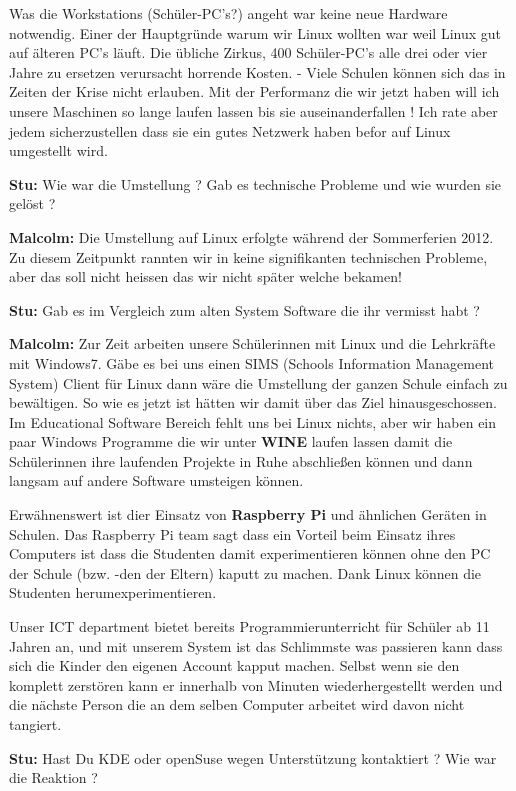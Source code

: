 \documentclass[10pt,a4paper,ngerman,twoside]{article} %
\begin{document}
Was die Workstations (Schüler-PC's?) angeht war keine neue Hardware notwendig. Einer der Hauptgründe warum wir Linux wollten war weil Linux gut auf älteren PC's läuft. Die übliche Zirkus, 400 Schüler-PC's alle drei oder vier Jahre zu ersetzen verursacht horrende Kosten.
-
Viele Schulen können sich das in Zeiten der Krise nicht erlauben. Mit der Performanz die wir jetzt haben will ich unsere Maschinen so lange laufen lassen bis sie auseinanderfallen ! Ich rate aber jedem sicherzustellen dass sie ein gutes Netzwerk haben befor auf Linux umgestellt wird.

\textbf{Stu:} Wie war die Umstellung ? Gab es technische Probleme und wie wurden sie gelöst ?

\textbf{Malcolm:} Die Umstellung auf Linux erfolgte während der Sommerferien 2012. Zu diesem Zeitpunkt rannten wir in keine signifikanten technischen Probleme, aber das soll nicht heissen das wir nicht später welche bekamen!

\textbf{Stu:} Gab es im Vergleich zum alten System Software die ihr vermisst habt ?

\textbf{Malcolm:} Zur Zeit arbeiten unsere Schülerinnen mit Linux und die Lehrkräfte mit Windows7. Gäbe es bei uns einen SIMS (Schools Information Management System) Client für Linux dann wäre die Umstellung der ganzen Schule einfach zu bewältigen. So wie es jetzt ist hätten wir damit über das Ziel hinausgeschossen. Im Educational Software Bereich fehlt uns bei Linux nichts, aber wir haben ein paar Windows Programme die wir unter \textbf{WINE} laufen lassen damit die Schülerinnen ihre laufenden Projekte in Ruhe abschließen können und dann langsam auf andere Software umsteigen können.

Erwähnenswert ist dier Einsatz von \textbf{Raspberry Pi} und ähnlichen Geräten in Schulen. Das Raspberry Pi team sagt dass ein Vorteil beim Einsatz ihres Computers ist dass die Studenten damit experimentieren können ohne den PC der Schule (bzw. -den der Eltern) kaputt zu machen. Dank Linux können die Studenten herumexperimentieren. 

Unser ICT department bietet bereits Programmierunterricht für Schüler ab 11 Jahren an, und mit unserem System ist das Schlimmste was passieren kann dass sich die Kinder den eigenen Account kapput machen. Selbst wenn sie den komplett zerstören kann er innerhalb von Minuten wiederhergestellt werden und die nächste Person die an dem selben Computer arbeitet wird davon nicht tangiert. 

\textbf{Stu:} Hast Du KDE oder openSuse wegen Unterstützung kontaktiert ? Wie war die Reaktion ? 
\end{document}
